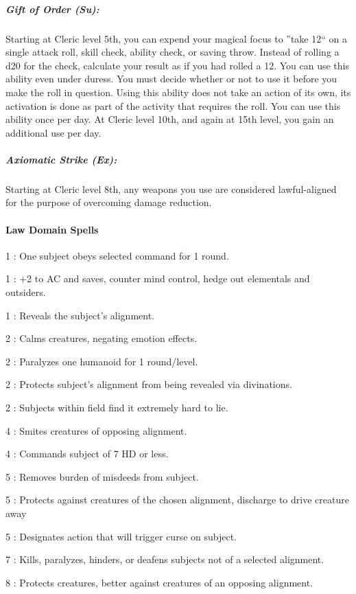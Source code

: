\subparagraph{Gift of Order (Su):}
Starting at Cleric level 5th, you can expend your magical focus to ''take 12`` on a single attack roll, skill check, ability check, or saving throw.
Instead of rolling a d20 for the check, calculate your result as if you had rolled a 12. 
You can use this ability even under duress.
You must decide whether or not to use it before you make the roll in question.
Using this ability does not take an action of its own, its activation is done as part of the activity that requires the roll.
You can use this ability once per day. At Cleric level 10th, and again at 15th level, you gain an additional use per day.
\subparagraph{Axiomatic Strike (Ex):}
Starting at Cleric level 8th, any weapons you use are considered lawful-aligned for the purpose of overcoming damage reduction.
\paragraph{Law Domain Spells}
\begin{list}{}{\leftmargin=1em}
\item[1] : One subject obeys selected command for 1 round.
\item[1] : +2 to AC and saves, counter mind control, hedge out elementals and outsiders.
\item[1] : Reveals the subject's alignment.
\item[2] : Calms creatures, negating emotion effects.
\item[2] : Paralyzes one humanoid for 1 round/level.
\item[2] : Protects subject's alignment from being revealed via divinations.
\item[2] : Subjects within field find it extremely hard to lie.
\item[4] : Smites creatures of opposing alignment.
\item[4] : Commands subject of 7 HD or less.
\item[5] : Removes burden of misdeeds from subject. 
\item[5] : Protects against creatures of the chosen alignment, discharge to drive creature away
\item[5] : Designates action that will trigger curse on subject.
\item[7] : Kills, paralyzes, hinders, or deafens subjects not of a selected alignment.
\item[8] : Protects creatures, better against creatures of an opposing alignment.
\end{list}
